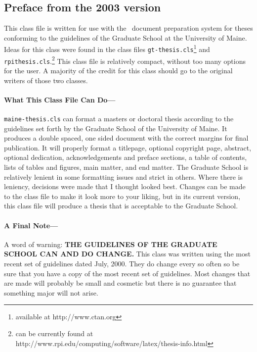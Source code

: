 \begin{preface}
\section{Preface from the 2003 version}

 This class file is written for use with the \LaTeXe\ document preparation system for theses
 conforming to the guidelines of the Graduate School at the University of Maine.  
 Ideas for this class were found in  
 the class files \verb=gt-thesis.cls=\footnote{available at
 http://www.ctan.org} and \verb=rpithesis.cls=.\footnote{can be currently found at
  http://www.rpi.edu/computing/software/latex/thesis-info.html}  This class
 file is relatively compact, without too many options for the user.  A majority of the
 credit for this class should go to the original writers of those two classes.  

 \paragraph{What This Class File Can Do---}
 \verb=maine-thesis.cls= can format a masters or doctoral thesis according to the guidelines set
 forth by the Graduate School of the University of Maine.  It produces a double spaced, one sided
 document with the correct margins for final publication. 
 It will properly format a titlepage, 
 optional copyright page, abstract, optional dedication, acknowledgements and preface sections,
 a table of contents, lists of tables and figures, main matter, and end matter.  The Graduate
 School is relatively lenient in some formatting issues and strict in others.  Where there is
 leniency, decisions were made that I thought looked best.  Changes can be made to the class file
 to make it look more to your liking, but in its current version, this class file
 will produce a thesis that is acceptable to the Graduate School.
 \paragraph{A Final Note---}
 A word of warning:  {\bfseries THE GUIDELINES OF THE GRADUATE SCHOOL CAN AND DO CHANGE.}	
 This class was written using the most recent set of guidelines dated July, 2000.  
 They do change every so often so be sure that you have a copy of the most recent set of
 guidelines.  Most changes that are made will probably be small and cosmetic but there is no guarantee that
 something major will not arise.  
 

\end{preface}

